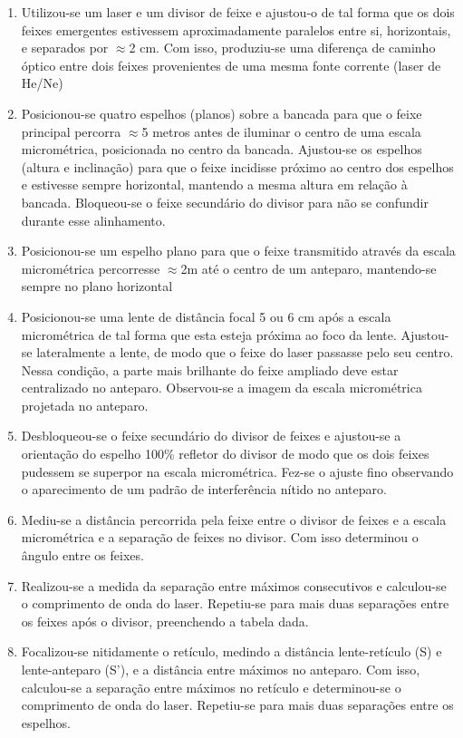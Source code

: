 \documentclass[
12pt,				%
openright,			%
oneside,			%
a4paper,			%
english,			%
french,				%
spanish,			%
brazil,				%
]{abntex2}
\begin{document}
\begin{enumerate}

\item Utilizou-se um laser e um divisor de feixe e ajustou-o de tal forma que os dois feixes
  emergentes estivessem aproximadamente paralelos entre si, horizontais, e
  separados por $\approx$2 cm. Com isso, produziu-se uma diferença de caminho óptico entre
  dois feixes provenientes de uma mesma fonte corrente (laser de He/Ne)
\item Posicionou-se quatro espelhos (planos) sobre a bancada para que o feixe principal
  percorra $\approx$5 metros antes de iluminar o centro de uma escala micrométrica,
  posicionada no centro da bancada. Ajustou-se os espelhos (altura e inclinação) para
  que o feixe incidisse próximo ao centro dos espelhos e estivesse sempre horizontal,
  mantendo a mesma altura em relação à bancada. Bloqueou-se o feixe secundário do
  divisor para não se confundir durante esse alinhamento.
\item Posicionou-se um espelho plano para que o feixe transmitido através da escala
  micrométrica percorresse $\approx$2m até o centro de um anteparo, mantendo-se sempre
  no plano horizontal
\item Posicionou-se uma lente de distância focal 5 ou 6 cm após a escala micrométrica de
  tal forma que esta esteja próxima ao foco da lente. Ajustou-se lateralmente a lente,
  de modo que o feixe do laser passasse pelo seu centro. Nessa condição, a parte
  mais brilhante do feixe ampliado deve estar centralizado no anteparo. Observou-se a
  imagem da escala micrométrica projetada no anteparo.
\item Desbloqueou-se o feixe secundário do divisor de feixes e ajustou-se a orientação do
  espelho 100\% refletor do divisor de modo que os dois feixes pudessem se superpor
  na escala micrométrica. Fez-se o ajuste fino observando o aparecimento de um
  padrão de interferência nítido no anteparo.
\item Mediu-se a distância percorrida pela feixe entre o divisor de feixes e a escala
  micrométrica e a separação de feixes no divisor. Com isso determinou o ângulo
  entre os feixes.
\item Realizou-se a medida da separação entre máximos consecutivos e calculou-se o
  comprimento de onda do laser. Repetiu-se para mais duas separações entre os
  feixes após o divisor, preenchendo a tabela dada.
\item Focalizou-se nitidamente o retículo, medindo a distância lente-retículo (S) e
  lente-anteparo (S’), e a distância entre máximos no anteparo. Com isso, calculou-se
  a separação entre máximos no retículo e determinou-se o comprimento de onda do
  laser. Repetiu-se para mais duas separações entre os espelhos.

\end{enumerate}
\end{document}
